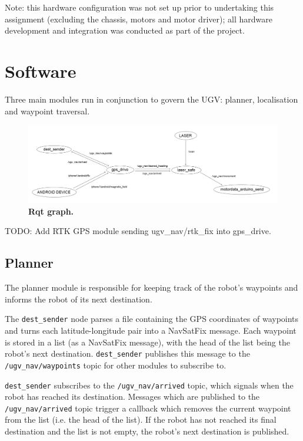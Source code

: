 \documentclass[titlepage,12pt,a4paper]{article}
\begin{document}
Note: this hardware configuration was not set up prior to undertaking this assignment (excluding the chassis, motors and motor driver); all hardware development and integration was conducted as part of the project.

\pagebreak
\section{Software}

Three main modules run in conjunction to govern the UGV: planner, localisation and waypoint traversal.

\begin{figure}[h]
	\centering
	\includegraphics[scale=0.255]{figures/rqt.png}
	\caption{\textbf{Rqt graph.}}
\end{figure}

TODO: Add RTK GPS module sending ugv\_nav/rtk\_fix into gps\_drive.

\subsection{Planner}
The planner module is responsible for keeping track of the robot's waypoints and informs the robot of its next destination. 

The \verb|dest_sender| node parses a file containing the GPS coordinates of waypoints and turns each latitude-longitude pair into a NavSatFix message. Each waypoint is stored in a list (as a NavSatFix message), with the head of the list being the robot's next destination. \verb|dest_sender| publishes this message to the \verb|/ugv_nav/waypoints| topic for other modules to subscribe to.

\verb|dest_sender| subscribes to the \verb|/ugv_nav/arrived| topic, which signals when the robot has reached its destination. Messages which are published to the \verb|/ugv_nav/arrived| topic trigger a callback which removes the current waypoint from the list (i.e. the head of the list). If the robot has not reached its final destination and the list is not empty, the robot's next destination is published.
\end{document}
